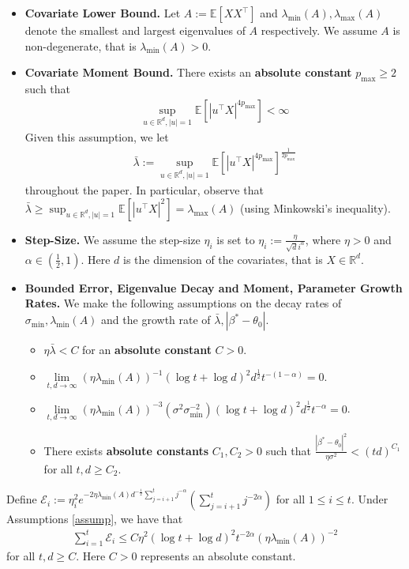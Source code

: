 \documentclass[10pt,a4paper]{amsart}
\begin{document}
\begin{assumption}
\begin{itemize}[leftmargin=0.3in]
\item[(iii)] \textbf{Covariate Lower Bound.} Let $A := \mathbb{E}[XX^\top]$ and $\lambda_{\min}(A), \lambda_{\max}(A)$ denote the smallest and largest eigenvalues of $A$ respectively. We assume $A$ is non-degenerate, that is $\lambda_{\min} (A) > 0$.  
\item[(iv)] \textbf{Covariate Moment Bound.} There exists an \textbf{absolute constant} $p_{\max} \geq 2$ such that
\begin{align*}
\sup_{u \in \mathbb{R}^d, |u| = 1}\mathbb{E}[|u^\top X|^{4p_{\max}}] < \infty
\end{align*}
Given this assumption, we let 
\begin{align*}
\bar{\lambda} := \sup_{u \in \mathbb{R}^d, |u| = 1} \mathbb{E}[|u^\top X|^{4p_{\max}}]^{\frac{1}{2p_{\max}}}
\end{align*}
throughout the paper. In particular, observe that $\bar{\lambda} \geq \sup_{u \in \mathbb{R}^d, |u| = 1} \mathbb{E}[|u^\top X|^{2}] = \lambda_{\max}(A)$ (using Minkowski's inequality). 
\item[(v)] \textbf{Step-Size.} We assume the step-size $\eta_i$ is set to $\eta_i := \frac{\eta}{\sqrt{d}i^{\alpha}}$, where $\eta > 0$ and $\alpha \in (\frac{1}{2}, 1)$. Here $d$ is the dimension of the covariates, that is $X \in \mathbb{R}^d$.
\item[(vi)] \textbf{Bounded Error, Eigenvalue Decay and Moment, Parameter Growth Rates.} We make the following assumptions on the decay rates of $\sigma_{\min}, \lambda_{\min}(A)$ and the growth rate of $\bar{\lambda}, |\beta^* - \theta_0|$.   
\begin{itemize}
    \item $\eta \bar{\lambda} < C$ for an \textbf{absolute constant} $C > 0$.
    \item $\lim\limits_{t,d \to \infty} (\eta \lambda_{\min}(A))^{-1}(\log t + \log d)^2d^{\frac{1}{2}}t^{-(1 - \alpha)} = 0$. 
    \item $\lim\limits_{t,d \to \infty} (\eta \lambda_{\min}(A))^{-3} (\sigma^2\sigma^{-2}_{\min})(\log t + \log d)^2d^{\frac{1}{2}}t^{-\alpha} = 0$.
    \item There exists \textbf{absolute constants} $C_1, C_2 > 0$ such that $\frac{|\beta^* - \theta_0|^2}{\eta \sigma^2} < (td)^{C_1}$ for all $t, d \geq C_2$. 
\end{itemize}
\end{itemize}
\end{assumption}

\begin{lemma}\label{variance-error-control}
Define $\mathcal E_i := \eta^2_ie^{-2\eta \lambda_{\min}(A) d^{-\frac{1}{2}}\sum_{j = i+1}^t j^{-\alpha}}(\sum_{j = i+1}^tj^{-2\alpha})$ for all $1 \leq i \leq t$. Under Assumptions \ref{assump}, we have that
\begin{align*}
    \sum_{i = 1}^t \mathcal E_i \leq C\eta^2(\log t + \log d)^2 t^{-2\alpha} (\eta\lambda_{\min}(A))^{-2}
\end{align*}
for all $t, d \geq C$. Here $C > 0$ represents an absolute constant. 
\end{lemma}
\end{document}
